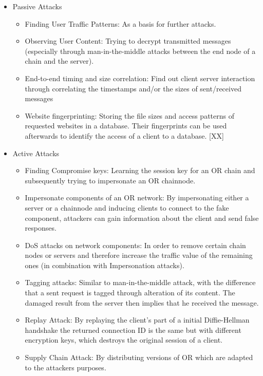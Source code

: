 \documentclass{sig-alternate}
\begin{document}
\begin{description} 
	\begin{itemize} \itemsep0pt 
		\item Passive Attacks
		\begin{itemize} \itemsep0pt 
			\item Finding User Traffic Patterns: As a basis for further attacks.
			\item Observing User Content: Trying to decrypt transmitted messages (especially through man-in-the-middle attacks between the end node of a chain and the server).
			\item End-to-end timing and size correlation: Find out client server interaction through correlating the timestamps and/or the sizes of sent/received messages 
			\item Website fingerprinting: Storing the file sizes and access patterns of requested websites in a database. Their fingerprints can be used afterwards to identify the access of a client to a database. [XX]
		\end{itemize}
		\item Active Attacks
		\begin{itemize} \itemsep0pt 
			\item Finding Compromise keys: Learning the session key for an OR chain and subsequently trying to impersonate an OR chainnode.
			\item Impersonate components of an OR network: By impersonating either a server or a chainnode and inducing clients to connect to the fake component, attackers can gain information about the client and send false responses.
			\item DoS attacks on network components: In order to remove certain chain nodes or servers and therefore increase the traffic value of the remaining ones (in combination with Impersonation attacks).
			\item Tagging attacks: Similar to man-in-the-middle attack, with the difference that a sent request is tagged through alteration of its content. The damaged result from the server then implies that he received the message. 
			\item Replay Attack: By replaying the client's part of a initial Diffie-Hellman handshake the returned connection ID is the same but with different encryption keys, which destroys the original session of a client.
			\item Supply Chain Attack: By distributing versions of OR which are adapted to the attackers purposes. 

\end{itemize}
\end{itemize}
\end{description}
\end{document}
